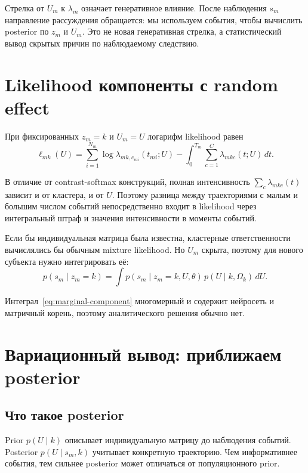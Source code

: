 \documentclass[12pt,a4paper]{article}
\begin{document}
Стрелка от \(U_m\) к \(\lambda_m\) означает генеративное влияние. После наблюдения \(s_m\) направление рассуждения обращается: мы используем события, чтобы вычислить posterior по \(z_m\) и \(U_m\). Это не новая генеративная стрелка, а статистический вывод скрытых причин по наблюдаемому следствию.

\section{Likelihood компоненты с random effect}

При фиксированных \(z_m=k\) и \(U_m=U\) логарифм likelihood равен
\begin{equation}
\ell_{mk}(U)=\sum_{i=1}^{N_m}\log\lambda_{mk,c_{mi}}(t_{mi};U)-\int_0^{T_m}\sum_{c=1}^{C}\lambda_{mkc}(t;U)\,dt.
\label{eq:component-likelihood}
\end{equation}

В отличие от contrast-softmax конструкций, полная интенсивность \(\sum_c\lambda_{mkc}(t)\) зависит и от кластера, и от \(U\). Поэтому разница между траекториями с малым и большим числом событий непосредственно входит в likelihood через интегральный штраф и значения интенсивности в моменты событий.

Если бы индивидуальная матрица была известна, кластерные ответственности вычислялись бы обычным mixture likelihood. Но \(U_m\) скрыта, поэтому для нового субъекта нужно интегрировать её:
\begin{equation}
p(s_m\mid z_m=k)=\int p(s_m\mid z_m=k,U,\theta)\,p(U\mid k,\Omega_k)\,dU.
\label{eq:marginal-component}
\end{equation}

Интеграл~\eqref{eq:marginal-component} многомерный и содержит нейросеть и матричный корень, поэтому аналитического решения обычно нет.

\section{Вариационный вывод: приближаем posterior}

\subsection{Что такое posterior}

Prior \(p(U\mid k)\) описывает индивидуальную матрицу до наблюдения событий. Posterior \(p(U\mid s_m,k)\) учитывает конкретную траекторию. Чем информативнее события, тем сильнее posterior может отличаться от популяционного prior.
\end{document}
